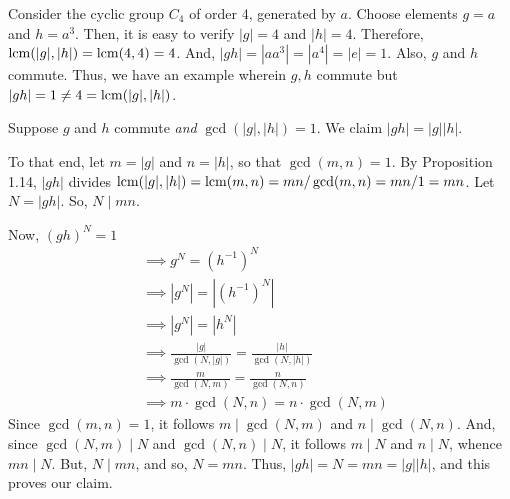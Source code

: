 \begin{xca}
Consider the cyclic group $C_4$ of order $4$, generated by $a$. Choose elements
$g = a$ and $h = a^3$. Then, it is easy to verify $|g| = 4$ and $|h| = 4$.
Therefore, $\operatorname{lcm}(|g|, |h|) = \operatorname{lcm}(4, 4) = 4$. And, $|gh| = |aa^3| = |a^4| =
|e| = 1$. Also, $g$ and $h$ commute. Thus, we have an example wherein $g, h$
commute but $|gh| = 1 \ne 4 = \operatorname{lcm}(|g|, |h|)$.
\end{xca}

\begin{xca}
Suppose $g$ and $h$ commute \emph{and} $\gcd(|g|, |h|) = 1$. We claim $|gh| =
|g||h|$.

To that end, let $m = |g|$ and $n = |h|$, so that $\gcd(m, n) = 1$. By
Proposition 1.14, $|gh|$ divides $\operatorname{lcm}(|g|, |h|) = \operatorname{lcm}(m, n) = mn/\gcd(m, n) =
mn/1 = mn$. Let $N = |gh|$. So, $N \mid mn$.

Now, $(gh)^N = 1$
\begin{align*}
    &\implies g^N = (h^{-1})^N \\
    &\implies |g^N| = |(h^{-1})^N| \\
    &\implies |g^N| = |h^N| \\
    &\implies \frac{|g|}{\gcd(N, |g|)} = \frac{|h|}{\gcd(N, |h|)} \\
    &\implies \frac{m}{\gcd(N, m)} = \frac{n}{\gcd(N, n)} \\
    &\implies m \cdot \gcd(N, n) = n \cdot \gcd(N, m)
\end{align*}
Since $\gcd(m, n) = 1$, it follows $m \mid \gcd(N, m)$ and $n \mid \gcd(N, n)$.
And, since $\gcd(N, m) \mid N$ and $ \gcd(N, n) \mid N$, it follows $m \mid N$
and $n \mid N$, whence $mn \mid N$. But, $N \mid mn$, and so, $N = mn$. Thus,
$|gh| = N = mn = |g||h|$, and this proves our claim.
\end{xca}
